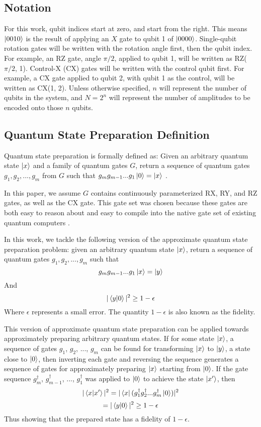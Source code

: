 \documentclass{article}
\begin{document}
\subsection{Notation}
For this work, qubit indices start at zero, and start from the right. This means
$\mathinner{|{0010}\rangle}$ is the result of applying an $X$ gate to qubit 1 of $\mathinner{|{0000}\rangle}$.
Single-qubit rotation gates will be written with the rotation angle first, then
the qubit index. For example, an RZ gate, angle $\pi/2$, applied to qubit 1,
will be written as RZ($\pi/2$, 1). Control-X (CX) gates will be written with the
control qubit first. For example, a CX gate applied to qubit 2, with qubit 1 as
the control, will be written as CX(1, 2).
Unless otherwise specified, $n$ will represent the number of qubits in the
system, and $N = 2^n$ will represent the number of amplitudes to be encoded
onto those $n$ qubits.

\subsection{Quantum State Preparation Definition}
Quantum state preparation is formally defined as: Given an arbitrary quantum
state $\mathinner{|{x}\rangle}$ and a family of quantum gates $G$, return a sequence of quantum
gates $g_1, g_2, ..., g_m$ from $G$ such that 
$g_mg_{m-1} ... g_1\mathinner{|{0}\rangle} = \mathinner{|{x}\rangle}$ \cite{1629135}.

In this paper, we assume $G$ contains continuously parameterized RX, RY, and RZ
gates, as well as the CX gate. This gate set was chosen
because these gates are both easy to reason about and easy to compile into
the native gate set of existing quantum computers \cite{maldonado2022error}.

In this work, we tackle the following version of the approximate quantum state
preparation problem: given an arbitrary quantum state $\mathinner{|{x}\rangle}$, return a
sequence of quantum gates $g_1, g_2, ..., g_m$ such that
$$g_mg_{m-1} ... g_1\mathinner{|{x}\rangle} = \mathinner{|{y}\rangle}$$
And
$$|\mathinner{\langle{y|0}\rangle}|^2 \geq 1 - \epsilon$$
Where $\epsilon$ represents a small error. The quantity $1 - \epsilon$ is
also known as the fidelity.

This version of approximate quantum state preparation can be applied towards
approximately preparing arbitrary quantum states. If for some state 
$\mathinner{|{x}\rangle}$, a sequence of gates $g_1$, $g_2$, ..., $g_m$ can be found for
transforming $\mathinner{|{x}\rangle}$ to $\mathinner{|{y}\rangle}$, a state close to $\mathinner{|{0}\rangle}$, then inverting
each gate and reversing the sequence generates a sequence of gates for 
approximately preparing $\mathinner{|{x}\rangle}$ starting from $\mathinner{|{0}\rangle}$.
If the gate sequence $g_m^{\dagger}$, $g_{m - 1}^{\dagger}$, ..., 
$g_1^{\dagger}$ was applied to $\mathinner{|{0}\rangle}$ to achieve the state $\mathinner{|{x'}\rangle}$, then
$$|\mathinner{\langle{x|x'}\rangle}|^2 = |\mathinner{\langle{x}|}(g_1^{\dagger}g_2^{\dagger} ... g_m^{\dagger}\mathinner{|{0}\rangle})|^2$$
$$ = |\mathinner{\langle{y|0}\rangle}|^2 \geq 1 - \epsilon$$
Thus showing that the prepared state has a fidelity of $1 - \epsilon$.
\end{document}

